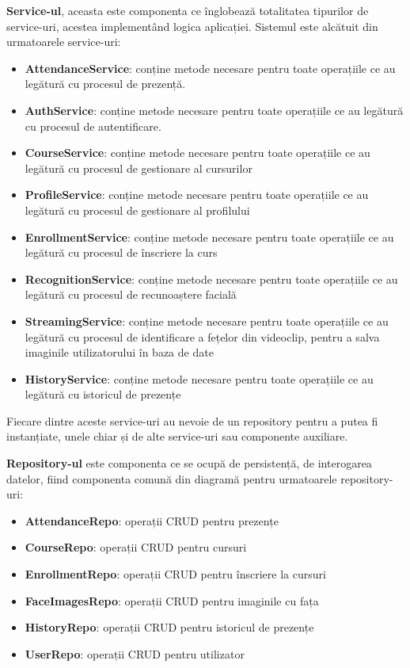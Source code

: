 \documentclass[a4paper, 12pt]{article}
\begin{document}
	\quad \textbf{Service-ul}, aceasta este componenta ce înglobează totalitatea tipurilor de service-uri, acestea implementând logica aplicației. Sistemul este alcătuit din urmatoarele service-uri:
	\begin{itemize}
		\item\textbf{AttendanceService}: conține metode necesare pentru toate operațiile ce au legătură cu procesul de prezență.
		\item\textbf{AuthService}: conține metode necesare pentru toate operațiile ce au legătură cu procesul de autentificare.
		\item\textbf{CourseService}: conține metode necesare pentru toate operațiile ce au legătură cu procesul de gestionare al cursurilor
		\item\textbf{ProfileService}: conține metode necesare pentru toate operațiile ce au legătură cu procesul de gestionare al profilului
		\item\textbf{EnrollmentService}: conține metode necesare pentru toate operațiile ce au legătură cu procesul de înscriere la curs
		\item\textbf{RecognitionService}: conține metode necesare pentru toate operațiile ce au legătură cu procesul de recunoaștere facială
		\item\textbf{StreamingService}: conține metode necesare pentru toate operațiile ce au legătură cu procesul de identificare a fețelor din videoclip, pentru a salva imaginile utilizatorului în baza de date
		\item\textbf{HistoryService}: conține metode necesare pentru toate operațiile ce au legătură cu istoricul de prezențe
	\end{itemize}
	
	Fiecare dintre aceste service-uri au nevoie de un repository pentru a putea fi instanțiate, unele chiar și de alte service-uri sau componente auxiliare. 
	
	\quad \textbf{Repository-ul} este componenta ce se ocupă de persistență, de interogarea datelor, fiind componenta comună din diagramă pentru urmatoarele repository-uri:
	\begin{itemize}
		\item \textbf{AttendanceRepo}: operații CRUD pentru prezențe
		\item \textbf{CourseRepo}: operații CRUD pentru cursuri
		\item \textbf{EnrollmentRepo}: operații CRUD pentru înscriere la cursuri
		\item \textbf{FaceImagesRepo}: operații CRUD pentru imaginile  cu fața
		\item \textbf{HistoryRepo}: operații CRUD pentru istoricul de prezențe
		\item \textbf{UserRepo}: operații CRUD pentru utilizator
	\end{itemize}
	
\end{document}
